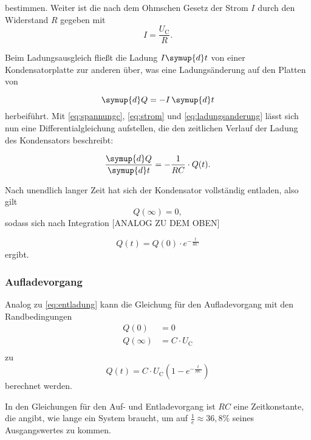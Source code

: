 bestimmen. Weiter ist die nach dem Ohmschen Gesetz der Strom $I$ durch den Widerstand $R$ gegeben mit
\begin{equation}
I = \frac{U_{\text{C}}}{R}.
\label{eq:strom}
\end{equation}

Beim Ladungsausgleich fließt die Ladung $I \symup{d}t$ von einer Kondensatorplatte zur anderen über, was eine Ladungsänderung auf den Platten von 

\begin{equation}
\symup{d}Q = -I\,\symup{d}t
\label{eq:ladungsanderung}
\end{equation}
herbeiführt. Mit \eqref{eq:spannungc}, \eqref{eq:strom} und \eqref{eq:ladungsanderung} lässt sich nun eine Differentialgleichung aufstellen, die den zeitlichen Verlauf der Ladung des Kondensators beschreibt:

\begin{equation}
\frac{\symup{d}Q}{\symup{d}t} = -\frac{1}{RC}\cdot Q(t).
\end{equation}

Nach unendlich langer Zeit hat sich der Kondensator vollständig entladen, also gilt
\begin{equation*}
Q(\infty) = 0,
\end{equation*}
sodass sich nach Integration [ANALOG ZU DEM OBEN] 

\begin{equation}
Q(t) = Q(0)\cdot e^{-\frac{t}{RC}}
\end{equation}
ergibt.

\subsubsection{Aufladevorgang}
Analog zu \eqref{eq:entladung} kann die Gleichung für den Aufladevorgang mit den Randbedingungen 
\begin{equation*}
\begin{aligned}
Q(0) &= 0 \\
Q(\infty) &= C\cdot U_{\text{C}} \\
\end{aligned}
\end{equation*}
zu 
\begin{equation}
Q(t) = C\cdot U_{\text{C}} (1- e^{-\frac{t}{RC}})
\end{equation}
berechnet werden.

In den Gleichungen für den Auf- und Entladevorgang ist $RC$ eine Zeitkonstante, die angibt, wie lange ein System braucht, um auf $\frac{1}{e} \approx 36{,}8\%$ seines Ausgangswertes zu kommen.

